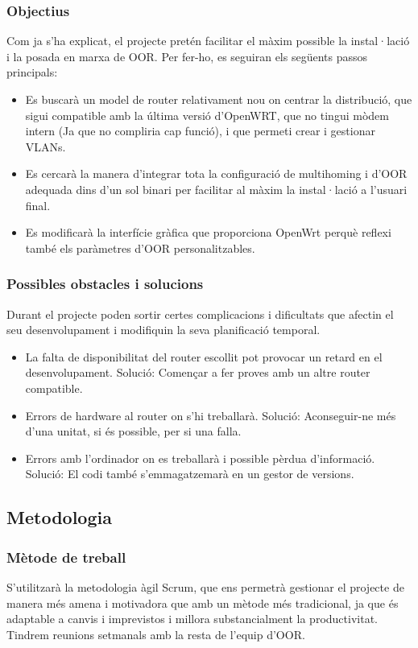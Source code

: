 \documentclass[11pt]{article}
\begin{document}
\subsubsection{Objectius}
Com ja s’ha explicat, el projecte pretén facilitar el màxim possible la instal·lació i la posada en marxa de OOR. Per fer-ho, es seguiran els següents passos principals:
\begin{itemize}
\item Es buscarà un model de router relativament nou on centrar la distribució, que sigui compatible amb la última versió d’OpenWRT, que no tingui mòdem intern (Ja que no compliria cap funció), i que permeti crear i gestionar VLANs.
\item Es cercarà la manera d’integrar tota la configuració de multihoming i d’OOR adequada dins d’un sol binari per facilitar al màxim la instal·lació a l’usuari final.
\item Es modificarà la interfície gràfica que proporciona OpenWrt perquè reflexi també els paràmetres d’OOR personalitzables.
\end{itemize}
\subsubsection{Possibles obstacles i solucions}
Durant el projecte poden sortir certes complicacions i dificultats que afectin el seu desenvolupament i modifiquin la seva planificació temporal.
\begin{itemize}
\item La falta de disponibilitat del router escollit pot provocar un retard en el  desenvolupament. Solució: Començar a fer proves amb un altre router compatible.
\item Errors de hardware al router on s’hi treballarà. Solució: Aconseguir-ne més d’una unitat, si és possible, per si una falla.
\item Errors amb l’ordinador on es treballarà i possible pèrdua d’informació. Solució: El codi també s’emmagatzemarà en un gestor de versions.
\end{itemize}
\subsection{Metodologia}
\subsubsection{Mètode de treball}
S’utilitzarà la metodologia àgil Scrum, que ens permetrà gestionar el projecte de manera més amena i motivadora que amb un mètode més tradicional, ja que és adaptable a canvis i imprevistos i millora substancialment la productivitat. Tindrem reunions setmanals amb la resta de l’equip d’OOR.
\end{document}
